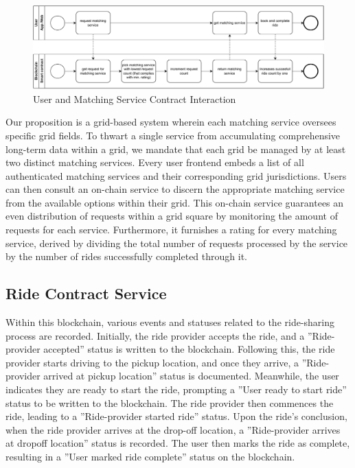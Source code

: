 \begin{figure}[h]
    \centering
    \includegraphics[width=\linewidth]{data/4.svg}
    \caption{User and Matching Service Contract Interaction}
    \label{fig:directSVG}
\end{figure}



Our proposition is a grid-based system wherein each matching service oversees specific grid fields. To thwart a single service from accumulating comprehensive long-term data within a grid, we mandate that each grid be managed by at least two distinct matching services. Every user frontend embeds a list of all authenticated matching services and their corresponding grid jurisdictions. Users can then consult an on-chain service to discern the appropriate matching service from the available options within their grid. This on-chain service guarantees an even distribution of requests within a grid square by monitoring the amount of requests for each service. Furthermore, it furnishes a rating for every matching service, derived by dividing the total number of requests processed by the service by the number of rides successfully completed through it.


\subsection{Ride Contract Service}\label{subsec:RideContractService}

Within this blockchain, various events and statuses related to the ride-sharing process are recorded. Initially, the ride provider accepts the ride, and a ''Ride-provider accepted'' status is written to the blockchain. Following this, the ride provider starts driving to the pickup location, and once they arrive, a ''Ride-provider arrived at pickup location'' status is documented. Meanwhile, the user indicates they are ready to start the ride, prompting a ''User ready to start ride'' status to be written to the blockchain. The ride provider then commences the ride, leading to a ''Ride-provider started ride'' status. Upon the ride's conclusion, when the ride provider arrives at the drop-off location, a ''Ride-provider arrives at dropoff location'' status is recorded. The user then marks the ride as complete, resulting in a ''User marked ride complete'' status on the blockchain.

